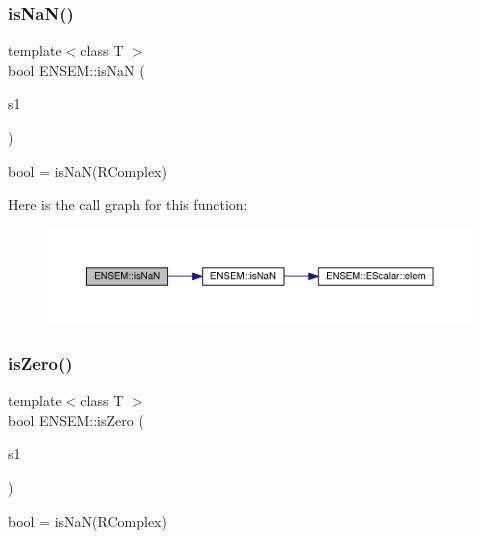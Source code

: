 \subsubsection{\texorpdfstring{isNaN()}{isNaN()}}
{\footnotesize\ttfamily template$<$class T $>$ \\
bool E\+N\+S\+E\+M\+::is\+NaN (\begin{DoxyParamCaption}\item[{const \mbox{\hyperlink{classENSEM_1_1RComplex}{R\+Complex}}$<$ T $>$ \&}]{s1 }\end{DoxyParamCaption})}



bool = is\+Na\+N(\+R\+Complex) 

Here is the call graph for this function\+:\nopagebreak
\begin{figure}[H]
\begin{center}
\leavevmode
\includegraphics[width=350pt]{da/dc7/group__rcomplex_ga909986b087edfa0819ffe4b76d00ed42_cgraph}
\end{center}
\end{figure}
\mbox{\label{group__rcomplex_ga21235851ad3c6bba4973c55332baaa9e}} 
\subsubsection{\texorpdfstring{isZero()}{isZero()}}
{\footnotesize\ttfamily template$<$class T $>$ \\
bool E\+N\+S\+E\+M\+::is\+Zero (\begin{DoxyParamCaption}\item[{const \mbox{\hyperlink{classENSEM_1_1RComplex}{R\+Complex}}$<$ T $>$ \&}]{s1 }\end{DoxyParamCaption})}



bool = is\+Na\+N(\+R\+Complex) 

